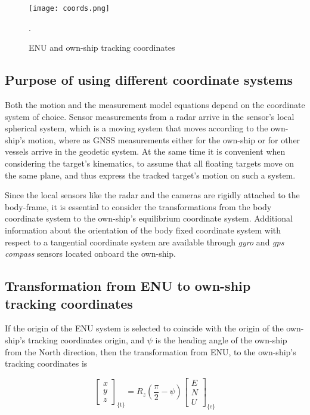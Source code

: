 \begin{figure}[H] 	
	\centering
	\texttt{[image: coords.png]}
	\caption{ENU and own-ship tracking coordinates}.
	\label{fig:tracking_coords}	
\end{figure}

\subsection{Purpose of using different coordinate systems}

Both the motion and the measurement model equations depend on the coordinate system of choice. Sensor measurements from a radar arrive in the sensor's local spherical system, which is a moving system that moves according to the own-ship's motion, where as GNSS measurements either for the own-ship or for other vessels arrive in the geodetic system. At the same time it is convenient when considering the target's kinematics, to assume that all floating targets move on the same plane, and thus express the tracked target's motion on such a system.

Since the local sensors like the radar and the cameras are rigidly attached to the body-frame, it is essential to consider the transformations from the body coordinate system to the own-ship's equilibrium coordinate system. Additional information about the orientation of the body fixed coordinate system with respect to a tangential coordinate system are available through \emph{gyro} and \emph{gps compass} sensors located onboard the own-ship. 

\subsection{Transformation from ENU to own-ship tracking coordinates}


If the origin of the ENU system is selected to coincide with the origin of the own-ship's tracking coordinates origin, and $\psi$ is the heading angle of the own-ship from the North direction, then the transformation from ENU, to the own-ship's tracking coordinates is





\begin{equation}
\begin{bmatrix}
x \\
y \\
z
\end{bmatrix}_{\text{\{t\}}} = R_{z}(\frac{\pi}{2}-\psi)
\begin{bmatrix}
E \\
N \\
U
\end{bmatrix}_{\text{\{e\}}}
\end{equation}

